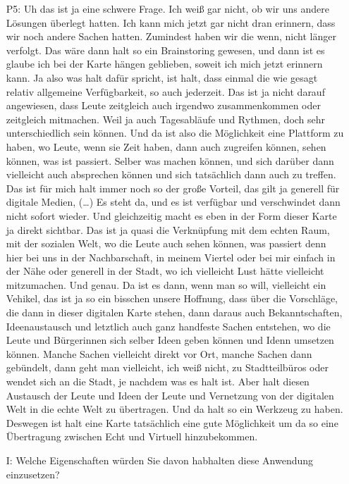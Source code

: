 \begin{itemize}
    \item[P5:] Uh das ist ja eine schwere Frage. Ich wei{\ss} gar nicht, ob wir uns andere L{\"o}sungen {\"u}berlegt hatten. Ich kann mich jetzt gar nicht dran erinnern, dass wir noch andere Sachen hatten. Zumindest haben wir die wenn, nicht l{\"a}nger verfolgt. Das w{\"a}re dann halt so ein Brainstoring gewesen, und dann ist es glaube ich bei der Karte h{\"a}ngen geblieben, soweit ich mich jetzt erinnern kann. Ja also was halt daf{\"u}r spricht, ist halt, dass einmal die wie gesagt relativ allgemeine Verf{\"u}gbarkeit, so auch jederzeit. Das ist ja nicht darauf angewiesen, dass Leute zeitgleich auch irgendwo zusammenkommen oder zeitgleich mitmachen. Weil ja auch Tagesabl{\"a}ufe und Rythmen, doch sehr unterschiedlich sein k{\"o}nnen. Und da ist also die M{\"o}glichkeit eine Plattform zu haben, wo Leute, wenn sie Zeit haben, dann auch zugreifen k{\"o}nnen, sehen k{\"o}nnen, was ist passiert. Selber was machen k{\"o}nnen, und sich dar{\"u}ber dann vielleicht auch absprechen k{\"o}nnen und sich tats{\"a}chlich dann auch zu treffen. Das ist f{\"u}r mich halt immer noch so der gro{\ss}e Vorteil, das gilt ja generell f{\"u}r digitale Medien, (\dots) Es steht da, und es ist verf{\"u}gbar und verschwindet dann nicht sofort wieder. Und gleichzeitig macht es eben in der Form dieser Karte ja direkt sichtbar. Das ist ja quasi die Verkn{\"u}pfung mit dem echten Raum, mit der sozialen Welt, wo die Leute auch sehen k{\"o}nnen, was passiert denn hier bei uns in der Nachbarschaft, in meinem Viertel oder bei mir einfach in der N{\"a}he oder generell in der Stadt, wo ich vielleicht Lust h{\"a}tte vielleicht mitzumachen. Und genau. Da ist es dann, wenn man so will, vielleicht ein Vehikel, das ist ja so ein bisschen unsere Hoffnung, dass {\"u}ber die Vorschl{\"a}ge, die dann in dieser digitalen Karte stehen, dann daraus auch Bekanntschaften, Ideenaustausch und letztlich auch ganz handfeste Sachen entstehen, wo die Leute und B{\"u}rgerinnen sich selber Ideen geben k{\"o}nnen und Idenn umsetzen k{\"o}nnen. Manche Sachen vielleicht direkt vor Ort, manche Sachen dann geb{\"u}ndelt, dann geht man vielleicht, ich wei{\ss} nicht, zu Stadtteilb{\"u}ros oder wendet sich an die Stadt, je nachdem was es halt ist. Aber halt diesen Austausch der Leute und Ideen der Leute und Vernetzung von der digitalen Welt in die echte Welt zu {\"u}bertragen. Und da halt so ein Werkzeug zu haben. Deswegen ist halt eine Karte tats{\"a}chlich eine gute M{\"o}glichkeit um da so eine {\"U}bertragung zwischen Echt und Virtuell hinzubekommen.
    \item[I:] Welche Eigenschaften w{\"u}rden Sie davon habhalten diese Anwendung einzusetzen?

\end{itemize}
